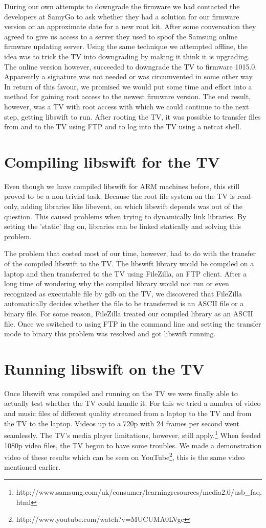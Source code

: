 During our own attempts to downgrade the firmware we had contacted the developers at SamyGo to ask 
whether they had a solution for our firmware version or an approximate date for a new root kit.
After some conversation they agreed to give us access to a server they used to spoof the Samsung online firmware updating server.
Using the same technique we attempted offline, the idea was to trick the TV into downgrading by making it think it is upgrading.
The online version however, succeeded to downgrade the TV to firmware 1015.0.
Apparently a signature was not needed or was circumvented in some other way.
In return of this favour, we promised we would put some time and effort into a method for gaining root access to the newest firmware version.
The end result, however, was a TV with root access with which we could continue to the next step, getting libswift to run.
After rooting the TV, it was possible to transfer files from and to the TV using FTP and to log into the TV using a netcat shell.

\section{Compiling libswift for the TV}
Even though we have compiled libswift for ARM machines before, this still proved to be a non-trivial task.
Because the root file system on the TV is read-only, adding libraries like libevent, on which libswift depends was out of the question.
This caused problems when trying to dynamically link libraries.
By setting the 'static' flag on, libraries can be linked statically and solving this problem.

The problem that costed most of our time, however, 
had to do with the transfer of the compiled libswift to the TV.
The libswift library would be compiled on a laptop and then transferred to the TV using FileZilla, an FTP client.
After a long time of wondering why the compiled library would not run or even recognized as executable file by gdb on the TV,
we discovered that FileZilla automatically decides whether the file to be transferred is an ASCII file or a binary file.
For some reason, FileZilla treated our compiled library as an ASCII file.
Once we switched to using FTP in the command line and setting the transfer mode to binary this problem was resolved and got libswift running.

\section{Running libswift on the TV}
Once libswift was compiled and running on the TV we were finally able to actually test whether the TV could handle it.
For this we tried a number of video and music files of different quality streamed from a laptop to the TV and from the TV to the laptop.
Videos up to a 720p with 24 frames per second went seamlessly.
The TV's media player limitations, however, still apply.\footnote{http://www.samsung.com/uk/consumer/learningresources/media2.0/usb_faq.html}
When feeded 1080p video files, the TV begun to have some troubles.
We made a demonstration video of these results which can be seen on YouTube\footnote{http://www.youtube.com/watch?v=MUCUMA0LVgc},
this is the same video mentioned earlier.

